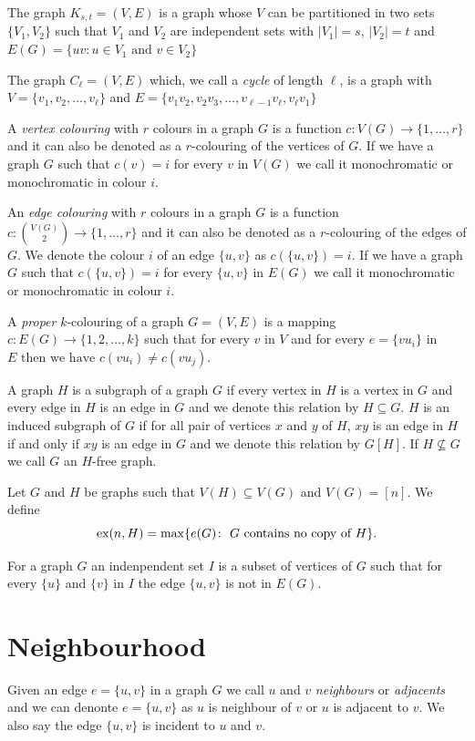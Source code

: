 \documentclass[12pt,twoside,a4paper,bibliography=totocnumbered]{book}
\numberwithin{equation}{section}
\theoremstyle{remark}
\def\ex{\mathop{\text{\rm ex}}\nolimits}
\begin{document}
The graph $K_{s,t} = (V,E)$ is a graph whose $V$ can be partitioned in two sets $\{V_1,V_2\}$ such that $V_1$ and $V_2$ are independent sets with $|V_1| = s$, $|V_2| = t$ and $E(G) = \{uv: u \in V_1 \text{ and } v \in V_2\}$

The graph $C_{\ell} = (V,E)$ which, we call a {\it cycle} of length $\ell$, is a graph with $V =\{v_1,v_2, \ldots, v_{\ell}\}$ and $E=\{v_1v_2,v_2v_3,\ldots, v_{\ell-1}v_{\ell},v_{\ell}v_1\}$

A {\it vertex colouring} with $r$ colours in a graph $G$ is a function $c\colon V(G) \rightarrow \{1,\ldots,r\}$ and it can also be denoted as a $r$-colouring of the vertices of $G$. If we have a graph $G$ such that $c(v)=i$ for every $v$ in $V(G)$ we call it monochromatic or monochromatic in colour $i$.


An {\it edge colouring} with $r$ colours in a graph $G$ is a function $c\colon \binom{V(G)}{2} \rightarrow \{1,\ldots,r\}$ and it can also be denoted as a $r$-colouring of the edges of $G$. We denote the colour $i$ of an edge $\{u,v\}$ as $c(\{u,v\})=i$. If we have a graph $G$ such that $c(\{u,v\})=i$ for every $\{u,v\}$ in $E(G)$ we call it monochromatic or monochromatic in colour $i$.

A {\it proper} $k$-colouring of a graph $G=(V,E)$ is a mapping $c\colon E(G) \rightarrow \{1,2,
\ldots,k\}$ such that for every $v$ in $V$ and for every $e =\{vu_i\}$ in $E \text{ then we have } c(vu_i) \neq c(vu_j)$.

A graph $H$ is a subgraph of a graph $G$ if every vertex in $H$ is a vertex in $G$ and every edge in $H$ is an edge in $G$ and we denote this relation by $H \subseteq G$. $H$ is an induced subgraph of $G$ if for all pair of vertices $x$ and $y$ of $H$, $xy$ is an edge in $H$ if and only if $xy$ is an edge in $G$ and we denote this relation by $G[H]$. If $H \nsubseteq G$ we call $G$ an $H$-free graph.

Let $G$ and $H$ be graphs such that $V(H) \subseteq V(G)$ and $V(G)= [n]$. We define $$\ex(n,H) = \max\{e(G)\colon\text{ $G$ contains no copy of $H$}\}.$$ 

For a graph $G$ an indenpendent set $I$ is a subset of vertices of $G$ such that for every $\{u\}$ and $\{v\}$ in $I$ the edge $\{u,v\}$ is not in $E(G)$.

\section{Neighbourhood}
Given an edge $e =\{u,v\}$ in a graph $G$ we call $u$ and $v$ {\it neighbours} or {\it adjacents} and we can denonte $e =\{u,v\}$ as $u$ is neighbour of $v$ or $u$ is adjacent to $v$. We also say the edge $\{u,v\}$ is incident to $u$ and $v$.
\end{document}
